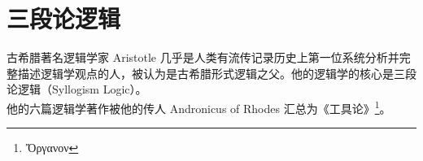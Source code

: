 \section{三段论逻辑}\label{sec:LogicAndInference/Syllogism}
    古希腊著名逻辑学家 Aristotle 几乎是人类有流传记录历史上第一位系统分析并完整描述逻辑学观点的人，被认为是古希腊形式逻辑之父。他的逻辑学的核心是三段论逻辑（Syllogism Logic）。\\

    他的六篇逻辑学著作被他的传人 Andronicus of Rhodes 汇总为《工具论》\footnote{Ὄργανον\cite{andronikos-organon}}。
